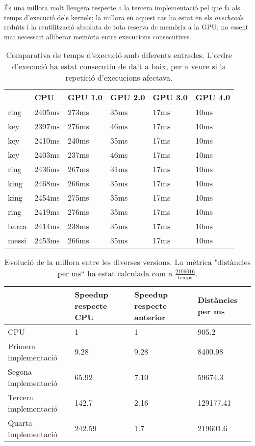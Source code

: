 \documentclass[catalan,10pt,a4paper]{article}
\begin{document}
És una millora molt lleugera respecte a la tercera implementació pel que fa als temps d'execució dels kernels; la millora en aquest cas ha estat en els \textit{overheads} reduïts i la reutilització absoluta de tota reserva de memòria a la GPU, no essent mai necessari alliberar memòria entre execucions consecutives.
\begin{table}[!h]
\centering
\begin{tabular}{|l|l|l|l|l|l|}
\hline
      & CPU  & GPU 1.0 & GPU 2.0 & GPU 3.0 & GPU 4.0 \\ \hline
ring  & 2405ms & 273ms & 35ms & 17ms & 10ms \\ \hline
key   & 2397ms & 276ms & 46ms & 17ms & 10ms\\ \hline
key   & 2410ms & 240ms & 35ms & 17ms & 10ms\\ \hline
key   & 2403ms & 237ms & 46ms & 17ms & 10ms\\ \hline
ring  & 2436ms & 267ms & 31ms & 17ms & 10ms\\ \hline
king  & 2468ms & 266ms & 35ms & 17ms & 10ms\\ \hline
king  & 2454ms & 275ms & 35ms & 17ms & 10ms\\ \hline
ring  & 2419ms & 276ms & 35ms & 17ms & 10ms\\ \hline
barca & 2414ms & 238ms & 35ms & 17ms & 10ms\\ \hline
messi & 2453ms & 266ms & 35ms & 17ms & 10ms\\ \hline
\end{tabular}
\caption{Comparativa de temps d'execució amb diferents entrades. L'ordre d'execució ha estat consecutiu de dalt a baix, per a veure si la repetició d'execucions afectava.}\label{tb:keys}
\end{table}
\begin{table}[!h]
\centering
\begin{tabular}{|l|l|l|l|}
\hline
      & Speedup respecte CPU & Speedup respecte anterior & Distàncies per ms \\ \hline
CPU & 1 & 1 & 905.2 \\ \hline
Primera implementació & 9.28 & 9.28 & 8400.98 \\ \hline
Segona implementació & 65.92 & 7.10 & 59674.3  \\ \hline
Tercera implementació & 142.7 & 2.16 & 129177.41  \\ \hline
Quarta implementació & 242.59 & 1.7 & 219601.6 \\ \hline
\end{tabular}
\caption{Evolució de la millora entre les diverses versions. La mètrica "distàncies per ms`` ha estat calculada com a $\frac{2196016}{\text{temps}}$.} \label{tb:speedup}
\end{table}
\end{document}
